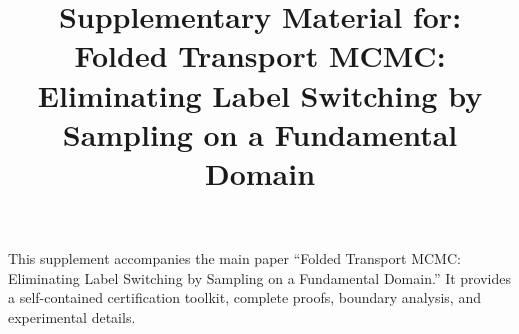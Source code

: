 \documentclass[a4paper,12pt]{article}
\title{Supplementary Material for:\\
  Folded Transport MCMC: Eliminating Label Switching
  by Sampling on a Fundamental Domain}
\author{}
\date{}
\theoremstyle{definition}
\theoremstyle{remark}
\begin{document}
\maketitle

\noindent
This supplement accompanies the main paper ``Folded Transport
MCMC: Eliminating Label Switching by Sampling on a Fundamental
Domain.''  It provides a self-contained certification
toolkit, complete proofs, boundary analysis, and experimental
details.

\bigskip




\end{document}
